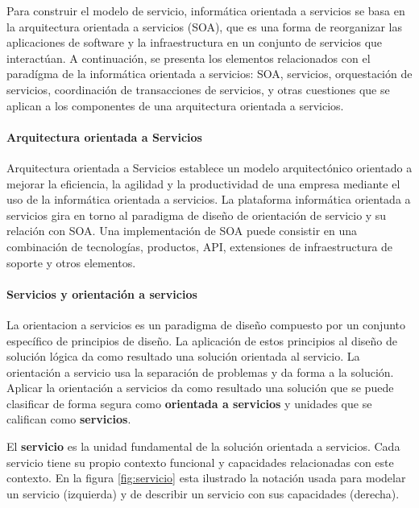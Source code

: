  Para construir el modelo de servicio, informática orientada a servicios se basa en la arquitectura orientada a servicios (SOA), que es una forma de reorganizar las aplicaciones de software y la infraestructura en un conjunto de servicios que interactúan.  A continuaci\'on, se presenta los elementos relacionados con el parad\'igma de la inform\'atica orientada a servicios: SOA, servicios, orquestación de servicios,   coordinación de transacciones de servicios,  y otras cuestiones que se aplican a los componentes de una arquitectura orientada a servicios.
 
  
 
\paragraph{Arquitectura orientada a Servicios}

Arquitectura orientada a Servicios establece un modelo arquitectónico orientado a mejorar la eficiencia, la agilidad y la productividad de una empresa mediante el uso de la informática orientada a servicios.
 La plataforma informática orientada a servicios gira en torno al paradigma de diseño de orientación de servicio y su relación con SOA. 
 Una implementación de SOA puede consistir en una combinación de tecnologías, productos, API, extensiones de infraestructura de soporte y otros elementos.
 
 
 \paragraph{Servicios y orientación a servicios}
 
La  \gls{orientacion a servicios} es un paradigma de diseño compuesto por un 	conjunto específico de principios de diseño.   La aplicación de estos principios al diseño de solución lógica da como resultado una solución orientada al servicio.
 La orientación a servicio usa la separación de problemas y da forma a la solución. 	Aplicar la orientación a servicios  da como resultado una solución que se puede clasificar de forma segura como \textbf{orientada a servicios} y unidades que se califican como \textbf{servicios}. 
 
  El \textbf{\gls{servicio}} es la unidad fundamental de la solución orientada a servicios.  Cada servicio tiene su propio contexto funcional y capacidades relacionadas con este contexto.  En la figura \ref{fig:servicio} esta ilustrado la notaci\'on usada para modelar un servicio (izquierda) y de describir un  servicio con sus capacidades (derecha).
  
